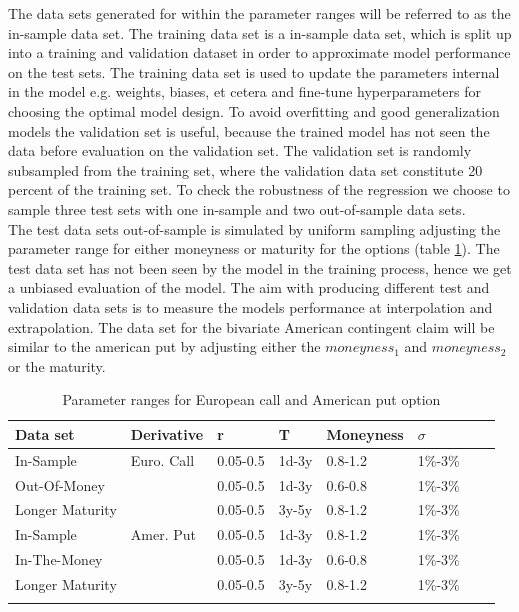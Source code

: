The data sets generated for within the parameter ranges will be referred to as the in-sample data set. The training data set is a in-sample data set, which is split up into a training and validation dataset in order to approximate model performance on the test sets. The training data set is used to update the parameters internal in the model e.g. weights, biases, et cetera and fine-tune hyperparameters for choosing the optimal model design. To avoid overfitting and good generalization models the validation set is useful, because the trained model has not seen the data before evaluation on the validation set. The validation set is randomly subsampled from the training set, where the validation data set constitute 20 percent of the training set. To check the robustness of the regression we choose to sample three test sets with one in-sample and two out-of-sample data sets. \\

The test data sets out-of-sample is simulated by uniform sampling adjusting the parameter range for either moneyness or maturity for the options (table \ref{tab:totalVanillaParRange}). The test data set has not been seen by the model in the training process, hence we get a unbiased evaluation of the model. The aim with producing different test and validation data sets is to measure the models performance at interpolation and extrapolation. The data set for the bivariate American contingent claim will be similar to the american put by adjusting either the $moneyness_1$ and $moneyness_2$ or the maturity.\\

\begin{table}[th]
\caption{Parameter ranges for European call and American put option}
\label{tab:totalVanillaParRange}
\centering
\begin{tabular}{l l l l l l l l }
\toprule
\textbf{Data set} & Derivative  & \textbf{r} & \textbf{T} & \textbf{Moneyness} & \textbf{$\sigma$} \\
\midrule
In-Sample & Euro. Call & 0.05-0.5 & 1d-3y & 0.8-1.2 & 1\%-3\%\\ 
Out-Of-Money & & 0.05-0.5 & 1d-3y & 0.6-0.8 & 1\%-3\%\\
Longer Maturity & & 0.05-0.5 & 3y-5y & 0.8-1.2 & 1\%-3\%\\
In-Sample & Amer. Put & 0.05-0.5 & 1d-3y & 0.8-1.2 & 1\%-3\%\\ 
In-The-Money & & 0.05-0.5 & 1d-3y & 0.6-0.8 & 1\%-3\%\\
Longer Maturity & & 0.05-0.5 & 3y-5y & 0.8-1.2 & 1\%-3\%\\
\bottomrule\\
\end{tabular}
\end{table}

